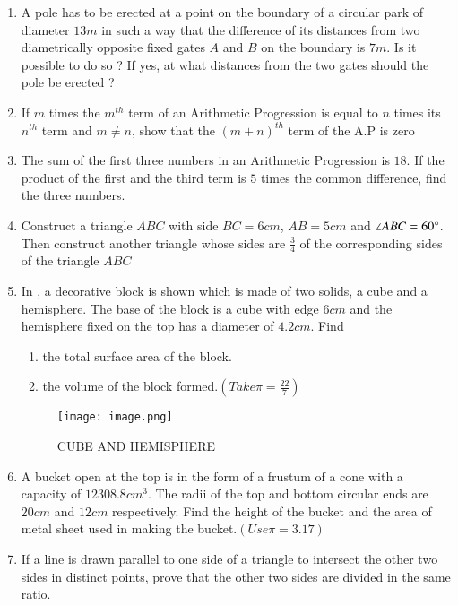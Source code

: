\documentclass[2pt,-letter paper]{article}
\providecommand{\brak}[1]{\ensuremath{\left(#1\right)}}
\begin{document}
\begin{enumerate}
\item A pole has to be erected at a point on the boundary of a circular park of diameter $13 m$ in such a way that the difference of its distances from two
diametrically opposite fixed gates $A$ and $B$ on the boundary is $7 m$. Is it possible to do so ? If yes, at what distances from the two gates should the pole be erected ?

\item If $m$ times the $m^{th}$ term of an Arithmetic Progression is equal to $n$ times
its $n^{th}$ term and $m \neq n$, show that the $\brak{m + n}^{th}$ term of the A.P is zero

\item The sum of the first three numbers in an Arithmetic Progression is $18$. If the product of the first and the third term is $5$ times the common
difference, find the three numbers.

\item Construct a triangle $ABC$ with side $BC = 6 cm$, $AB = 5 cm$ and $\angle ABC = 60\degree$. Then construct another triangle whose sides are $\frac{3}{4}$ of the corresponding sides of the triangle $ABC$

\item In , a decorative block is shown which is made of two solids, a cube and a hemisphere. The base of the block is a cube with edge $6 cm$
and the hemisphere fixed on the top has a diameter of $4.2 cm$. Find
 \begin{enumerate}
 \item  the total surface area of the block.
 \item the volume of the block formed.$(Take  \pi=\frac{22}{7})$
 \end{enumerate}
\begin{figure}[H]
    \centering
    \texttt{[image: image.png]}
    \caption{CUBE AND HEMISPHERE}
    \label{fig:Fig_3}
\end{figure}


\item A bucket open at the top is in the form of a frustum of a cone with a
capacity of $12308.8 cm^3$. The radii of the top and bottom circular ends are
$20 cm$ and $12 cm$ respectively. Find the height of the bucket and the area of metal sheet used in making the bucket.$(Use \pi=3.17)$

\item If a line is drawn parallel to one side of a triangle to intersect the other two sides in distinct points, prove that the other two sides are divided in the same ratio.


\end{enumerate}
\end{document}
